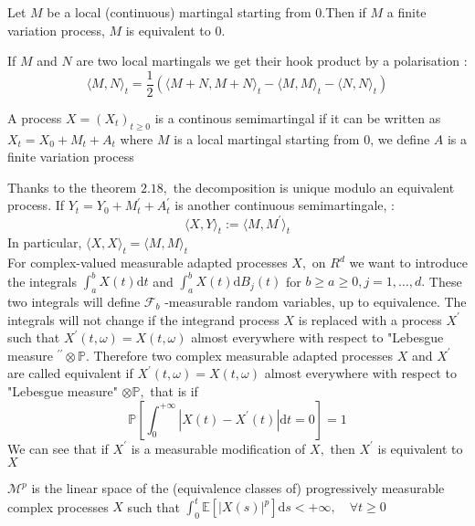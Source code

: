 \begin{theorem}
		Let $M$ be a local (continuous) martingal starting from $0$.Then if $M$ a finite variation process, $M$ is equivalent to $0.$
\end{theorem}

	If $M$ and $N$ are two local martingals we get their hook product by a polarisation :
	$$
	\langle M, N\rangle_{t}=\frac{1}{2}\left(\langle M+N, M+N\rangle_{t}-\langle M, M\rangle_{t}-\langle N, N\rangle_{t}\right)
	$$
	\begin{definition}
		A process $X=\left(X_{t}\right)_{t \geq 0}$ is a continous semimartingal if it can be written as $X_{t}=X_{0}+M_{t}+A_{t}$ where $M$ is a local martingal starting from $0$, we define $A$ is a finite variation process
	\end{definition}

	Thanks to the theorem $2.18,$ the decomposition is unique modulo an equivalent process. If $Y_{t}=Y_{0}+M_{t}^{\prime}+A_{t}^{\prime}$ is another continuous semimartingale,  :
	$$
	\langle X, Y \rangle_{t}:= \langle M, M^{\prime}\rangle_{t}
	$$
	In particular, $\langle X, X \rangle_{t}= \langle M, M \rangle_{t}$
	\\
	For complex-valued measurable adapted processes $X,$ on $R^d$ we want to introduce the integrals $\int_{a}^{b} X(t) \mathrm{d} t$ and $\int_{a}^{b} X(t) \mathrm{d} B_{j}(t)$ for $b \geq a \geq 0, j=1, \ldots, d .$ These
	two integrals will define $\mathcal{F}_{b}$ -measurable random variables, up to equivalence. The integrals will not change if the integrand process $X$ is replaced with a process $X^{\prime}$ such that $X^{\prime}(t, \omega)=X(t, \omega)$ almost everywhere with respect to "Lebesgue measure $^{\prime \prime} \otimes \mathbb{P}$. Therefore two complex measurable adapted processes $X$ and $X^{\prime}$ are called equivalent if $X^{\prime}(t, \omega)=X(t, \omega)$ almost everywhere with respect to "Lebesgue measure" $\otimes \mathbb{P},$ that is if
	\[
	\mathbb{P}\left[\int_{0}^{+\infty}\left|X(t)-X^{\prime}(t)\right| \mathrm{d} t=0\right]=1
	\]
	We can see that if $X^{\prime}$ is a measurable modification of $X,$ then $X^{\prime}$ is equivalent to $X$
	\begin{definition}

		$\mathcal{M}^{p}$ is the linear space of the (equivalence classes of) progressively measurable complex processes $X$ such that
		$
		\int_{0}^{t} \mathbb{E}\left[|X(s)|^{p}\right] \mathrm{d} s<+\infty, \quad \forall t \geq 0
		$
	\end{definition}


